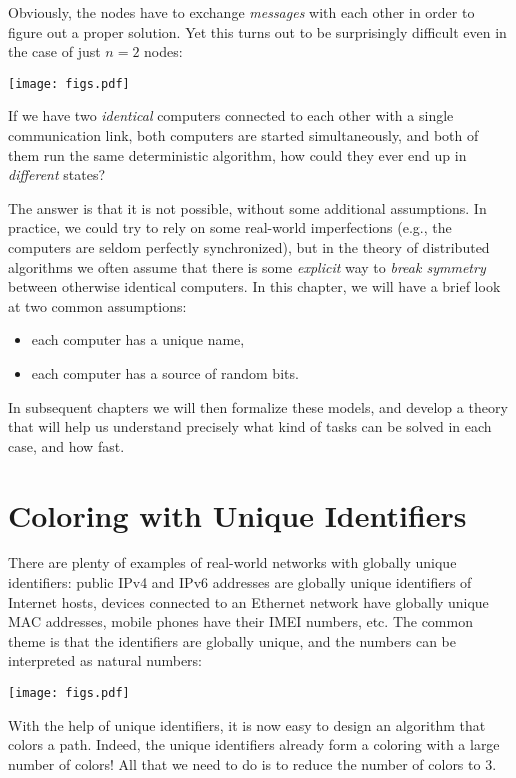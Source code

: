 Obviously, the nodes have to exchange \emph{messages} with each other in order to figure out a proper solution. Yet this turns out to be surprisingly difficult even in the case of just $n = 2$ nodes:
\begin{center}
    \texttt{[image: figs.pdf]}
\end{center}
If we have two \emph{identical} computers connected to each other with a single communication link, both computers are started simultaneously, and both of them run the same deterministic algorithm, how could they ever end up in \emph{different} states?

The answer is that it is not possible, without some additional assumptions. In practice, we could try to rely on some real-world imperfections (e.g., the computers are seldom perfectly synchronized), but in the theory of distributed algorithms we often assume that there is some \emph{explicit} way to \emph{break symmetry} between otherwise identical computers. In this chapter, we will have a brief look at two common assumptions:
\begin{itemize}[noitemsep]
    \item each computer has a unique name,
    \item each computer has a source of random bits.
\end{itemize}
In subsequent chapters we will then formalize these models, and develop a theory that will help us understand precisely what kind of tasks can be solved in each case, and how fast.


\section{Coloring with Unique Identifiers}\label{sec:algo-p3c}

There are plenty of examples of real-world networks with globally unique identifiers: public IPv4 and IPv6 addresses are globally unique identifiers of Internet hosts, devices connected to an Ethernet network have globally unique MAC addresses, mobile phones have their IMEI numbers, etc. The common theme is that the identifiers are globally unique, and the numbers can be interpreted as natural numbers:
\begin{center}
    \texttt{[image: figs.pdf]}
\end{center}
With the help of unique identifiers, it is now easy to design an algorithm that colors a path. Indeed, the unique identifiers already form a coloring with a large number of colors! All that we need to do is to reduce the number of colors to $3$.

